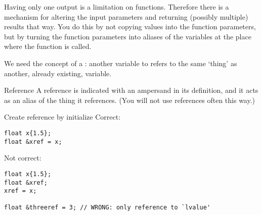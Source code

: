 Having only one output is a limitation on functions. Therefore there
is a mechanism for altering the input parameters and returning
(possibly multiple) results that way. You do this by not copying
values into the function parameters, but by turning the function
parameters into aliases of the variables at the place where the
function is called.

We need the concept of a :
another variable to refers to the same `thing' as another,
already existing, variable.

\begin{block}{Reference}
  \label{sl:cpp-reference}
  A reference is indicated with an ampersand in its definition, and it
  acts as an alias of the thing it references.
  (You will not use references often this way.)
\end{block}

\begin{block}{Create reference by initialize}
  \label{sl:cpp-ref-define}
  Correct:
\begin{lstlisting}
float x{1.5};
float &xref = x;
\end{lstlisting}
Not correct:
\begin{lstlisting}
float x{1.5};
float &xref;
xref = x;

float &threeref = 3; // WRONG: only reference to `lvalue'
\end{lstlisting}
\end{block}

\begin{comment}
  \begin{advanced}
    If you already know about pointers, you may wonder about the similarities.
    \begin{itemize}
    \item There are no `null' references. There is a \indexc{nullptr}.
    \item References are bound when they are created.
    \item You can not change what a reference is bound to;
      the pointer target can change.
    \item Reference syntax is cleaner.
    \item Pointer use has implications about ownership: use only for specific purposes.
    \end{itemize}
  \end{advanced}
\end{comment}

